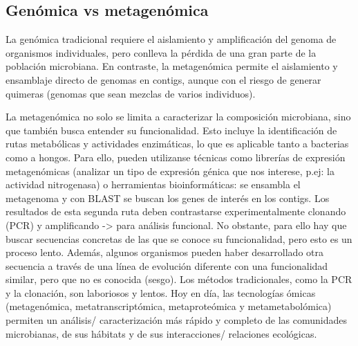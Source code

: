 \subsection{Genómica vs metagenómica}
La genómica tradicional requiere el aislamiento y amplificación del genoma de organismos individuales, pero conlleva la pérdida de una gran parte de la población microbiana. En contraste, la metagenómica permite el aislamiento y ensamblaje directo de genomas en contigs, aunque con el riesgo de generar quimeras (genomas que sean mezclas de varios individuos).

La metagenómica no solo se limita a caracterizar la composición microbiana, sino que también busca entender su funcionalidad. Esto incluye la identificación de rutas metabólicas y actividades enzimáticas, lo que es aplicable tanto a bacterias como a hongos. Para ello, pueden utilizanse técnicas como librerías de expresión metagenómicas (analizar un tipo de expresión génica que nos interese, p.ej: la actividad nitrogenasa) o herramientas bioinformáticas: se ensambla el metagenoma y con BLAST se buscan los genes de interés en los contigs. Los resultados de esta segunda ruta deben contrastarse experimentalmente clonando (PCR) y amplificando -> para análisis funcional. No obstante, para ello hay que buscar secuencias concretas de las que se conoce su funcionalidad, pero esto es un proceso lento. Además, algunos organismos pueden haber desarrollado otra secuencia a través de una línea de evolución diferente con una funcionalidad similar, pero que no es conocida (sesgo).
Los métodos tradicionales, como la PCR y la clonación, son laboriosos y lentos. Hoy en día, las tecnologías ómicas (metagenómica, metatranscriptómica, metaproteómica y metametabolómica) permiten un análisis/ caracterización más rápido y completo de las comunidades microbianas, de sus hábitats y de sus interacciones/ relaciones ecológicas.

